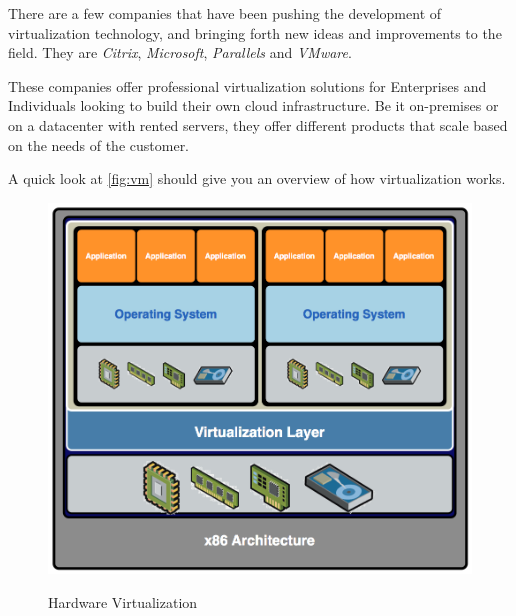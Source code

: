 There are a few companies that have been pushing the development of virtualization technology, and bringing forth new ideas and improvements to the field. They are \textit{Citrix}, \textit{Microsoft}, \textit{Parallels} and \textit{VMware}.

These companies offer professional virtualization solutions for Enterprises and Individuals looking to build their own cloud infrastructure. Be it on-premises or on a datacenter with rented servers, they offer different products that scale based on the needs of the customer.

A quick look at \autoref{fig:vm} should give you an overview of how virtualization works. 

\begin{figure}[H]
    \begin{center}
        {\includegraphics[width=.70\linewidth]{gfx/vm}}
        \caption[Hardware Virtualization]{Hardware Virtualization\footnotemark}\label{fig:vm}
    \end{center}
\end{figure}
\\

